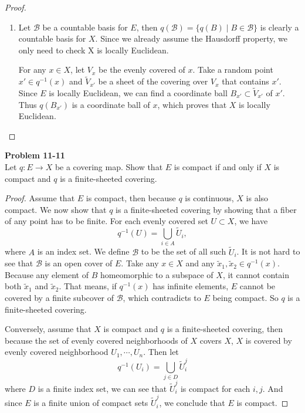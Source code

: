 \documentclass[12pt, a4paper]{article}
\theoremstyle{plain}
\newcommand{\B}{\mathscr{B}}
\def\tilde{\widetilde}
\newenvironment{problem}[2][Problem]
    { \begin{mdframed}[backgroundcolor=gray!20] \textbf{#1 #2} \\}
    {  \end{mdframed}}
\begin{document}
\begin{proof}
\begin{enumerate}[label=(\alph*)]
        \item Let $\B$ be a countable basis for $E$, then $q(\B) = \{q(B)\mid B\in \B\}$ is clearly a countable basis for $X$. Since we already assume the Hausdorff property, we only need to check X is locally Euclidean. 

        For any $x\in X$, let $V_x$ be the evenly covered of $x$. Take a random point $x'\in q^{-1}(x)$ and $\tilde V_{x'}$ be a sheet of the covering over $V_x$ that contains $x'$. Since $E$ is locally Euclidean, we can find a coordinate ball $B_{x'}\subset \tilde V_{x'}$ of $x'$. Thus $q(B_{x'})$ is a coordinate ball of $x$, which proves that $X$ is locally Euclidean.
    \end{enumerate}
    \end{proof}

\pagebreak

\begin{problem}{11-11}
    Let $q\colon E\to X$ be a covering map. Show that $E$ is compact if and only if $X$ is compact and $q$ is a finite-sheeted covering.
\end{problem}
    \begin{proof}
        Assume that $E$ is compact, then because $q$ is continuous, $X$ is also compact. We now show that $q$ is a finite-sheeted covering by showing that a fiber of any point has to be finite. For each evenly covered set $U\subset X$, we have
        \[
        q^{-1}(U) = \bigcup_{i\in A}\tilde U_i,
        \]
        where $A$ is an index set. We define $\B$ to be the set of all such $\tilde U_i$. It is not hard to see that $\B$ is an open cover of $E$. Take any $x\in X$ and any $\tilde x_1,\tilde x_2\in q^{-1}(x)$. Because any element of $B$ homeomorphic to a subspace of $X$, it cannot contain both $\tilde x_1$ and $\tilde x_2$. That means, if $q^{-1}(x)$ has infinite elements, $E$ cannot be covered by a finite subcover of $\B$, which contradicts to $E$ being compact. So $q$ is a finite-sheeted covering.

        Conversely, assume that $X$ is compact and $q$ is a finite-sheeted covering, then because the set of evenly covered neighborhoods of $X$ covers $X$, $X$ is covered by evenly covered neighborhood $U_1,\cdots, U_n$. Then let
        \[
        q^{-1}(U_i) = \bigcup_{j\in D}\tilde U_{i}^{j}
        \]
        where $D$ is a finite index set, we can see that $\tilde U_{i}^{j}$ is compact for each $i,j$. And since $E$ is a finite union of compact sets $\tilde U_i^j$, we conclude that $E$ is compact.
    \end{proof} 
\end{document}
